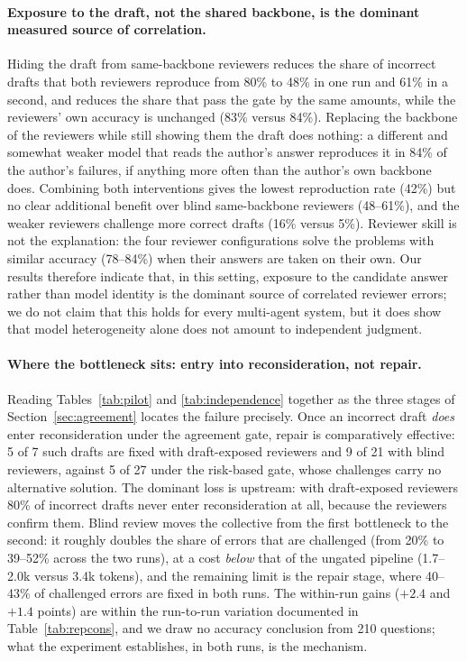 \paragraph{Exposure to the draft, not the shared backbone, is the dominant measured source of correlation.}
Hiding the draft from same-backbone reviewers reduces the share of incorrect drafts that both reviewers reproduce from 80\% to 48\% in one run and 61\% in a second, and reduces the share that pass the gate by the same amounts, while the reviewers' own accuracy is unchanged (83\% versus 84\%).
Replacing the backbone of the reviewers while still showing them the draft does nothing: a different and somewhat weaker model that reads the author's answer reproduces it in 84\% of the author's failures, if anything more often than the author's own backbone does.
Combining both interventions gives the lowest reproduction rate (42\%) but no clear additional benefit over blind same-backbone reviewers (48--61\%), and the weaker reviewers challenge more correct drafts (16\% versus 5\%).
Reviewer skill is not the explanation: the four reviewer configurations solve the problems with similar accuracy (78--84\%) when their answers are taken on their own.
Our results therefore indicate that, in this setting, exposure to the candidate answer rather than model identity is the dominant source of correlated reviewer errors; we do not claim that this holds for every multi-agent system, but it does show that model heterogeneity alone does not amount to independent judgment.

\paragraph{Where the bottleneck sits: entry into reconsideration, not repair.}
Reading Tables~\ref{tab:pilot} and \ref{tab:independence} together as the three stages of Section~\ref{sec:agreement} locates the failure precisely.
Once an incorrect draft \emph{does} enter reconsideration under the agreement gate, repair is comparatively effective: 5 of 7 such drafts are fixed with draft-exposed reviewers and 9 of 21 with blind reviewers, against 5 of 27 under the risk-based gate, whose challenges carry no alternative solution.
The dominant loss is upstream: with draft-exposed reviewers 80\% of incorrect drafts never enter reconsideration at all, because the reviewers confirm them.
Blind review moves the collective from the first bottleneck to the second: it roughly doubles the share of errors that are challenged (from 20\% to 39--52\% across the two runs), at a cost \emph{below} that of the ungated pipeline (1.7--2.0k versus 3.4k tokens), and the remaining limit is the repair stage, where 40--43\% of challenged errors are fixed in both runs.
The within-run gains (\(+2.4\) and \(+1.4\) points) are within the run-to-run variation documented in Table~\ref{tab:repcons}, and we draw no accuracy conclusion from 210 questions; what the experiment establishes, in both runs, is the mechanism.

